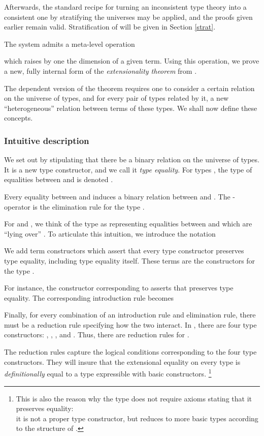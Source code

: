 \documentclass[10pt]{article}
\begin{document}
Afterwards, the standard recipe for turning an inconsistent type
theory into a consistent one by stratifying the universes may be
applied, and the proofs given earlier remain valid.
Stratification of  will be given in Section \ref{strat}.
 
The system admits a meta-level operation

which raises by one the dimension of a given term.
Using this operation, we prove a new, fully internal form of the \emph{extensionality
  theorem} from \cite{tait}.

The dependent version of the theorem requires one to
consider a certain relation on the universe of types, and for every pair of
types related by it, a new ``heterogeneous'' relation between terms of
these types.  We shall now define these concepts.

\subsubsection*{Intuitive description}
We set out by stipulating that there be a binary relation
 on the universe of types.
It is a new type constructor, and we call it \emph{type equality}.
For types , the type of equalities between  and  is
denoted .

Every equality  between  and  induces a binary
relation  between  and .  The
-operator is the elimination rule for the type .

For  and , we think of the type  as
representing equalities between  and  which are
``lying over'' .  To articulate this
intuition, we introduce the notation


We add term constructors which assert that every type constructor
preserves type equality, including type equality itself.  These terms
are the constructors for the type .

For instance, the constructor
corresponding to  asserts that  preserves type
equality.  The corresponding introduction rule becomes


Finally, for every combination of an introduction rule and elimination
rule, there must be a reduction rule specifying how the two
interact.  In , there are four type constructors: ,
, , and .  Thus, there are 
reduction rules for .

The reduction rules capture the logical conditions corresponding
to the four
type constructors.  They will insure that the extensional equality on
every type is \emph{definitionally} equal to a type expressible with
basic constructors.
\footnote{
This is also the reason why the type  does not require axioms stating that
it preserves equality:\\ it is not a proper type constructor, but 
reduces to more basic types according to the structure of .}
\end{document}
